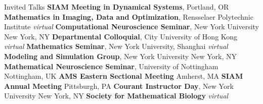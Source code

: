 \begin{rubric}{Invited Talks}
\entry*[2023.05]%
	\textbf{SIAM Meeting in Dynamical Systems}, \hfill Portland, OR
\entry*[2023.05]%
	\textbf{Mathematics in Imaging, Data and Optimization}, Rensselaer Polytechnic Institute \hfill \textit{virtual}
\entry*[2023.05]%
	\textbf{Computational Neuroscience Seminar}, New York University \hfill New York, NY
\entry*[2023.04]%
	\textbf{Departmental Colloquial}, City University of Hong Kong \hfill \textit{virtual}
 \entry*[2023.03]%
	\textbf{Mathematics Seminar}, New York University, Shanghai \hfill \textit{virtual}
  \entry*[2023.02]%
	\textbf{Modeling and Simulation Group}, New York University \hfill New York, NY
\entry*[2022.10]%
	\textbf{Mathematical Neuroscience Seminar}, University of Nottingham \hfill Nottingham, UK
\entry*[2022.10]%
	\textbf{AMS Eastern Sectional Meeting} \hfill Amherst, MA
\entry*[2022.07]%
    \textbf{SIAM Annual Meeting} \hfill Pittsburgh, PA
\entry*[2022.02]%
    \textbf{Courant Instructor Day}, New York University \hfill New York, NY
\entry*[2021.06]%
    \textbf{Society for Mathematical Biology} \hfill \textit{virtual}

\end{rubric}
